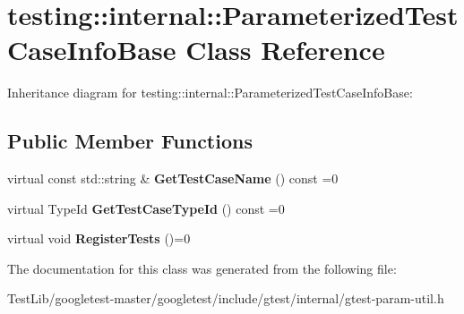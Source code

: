 \hypertarget{classtesting_1_1internal_1_1ParameterizedTestCaseInfoBase}{}\section{testing\+:\+:internal\+:\+:Parameterized\+Test\+Case\+Info\+Base Class Reference}
\label{classtesting_1_1internal_1_1ParameterizedTestCaseInfoBase}


Inheritance diagram for testing\+:\+:internal\+:\+:Parameterized\+Test\+Case\+Info\+Base\+:
\subsection*{Public Member Functions}
\begin{DoxyCompactItemize}
\item 
\mbox{\label{classtesting_1_1internal_1_1ParameterizedTestCaseInfoBase_ac69b3bc29debfd6d891b7f5b2d088b1c}} 
virtual const std\+::string \& {\bfseries Get\+Test\+Case\+Name} () const =0
\item 
\mbox{\label{classtesting_1_1internal_1_1ParameterizedTestCaseInfoBase_a932b4a9185a72d5bdfa5fd84fc06cbca}} 
virtual Type\+Id {\bfseries Get\+Test\+Case\+Type\+Id} () const =0
\item 
\mbox{\label{classtesting_1_1internal_1_1ParameterizedTestCaseInfoBase_a92baca6c64c822c2e7043217f7903ef2}} 
virtual void {\bfseries Register\+Tests} ()=0
\end{DoxyCompactItemize}


The documentation for this class was generated from the following file\+:\begin{DoxyCompactItemize}
\item 
Test\+Lib/googletest-\/master/googletest/include/gtest/internal/gtest-\/param-\/util.\+h\end{DoxyCompactItemize}
